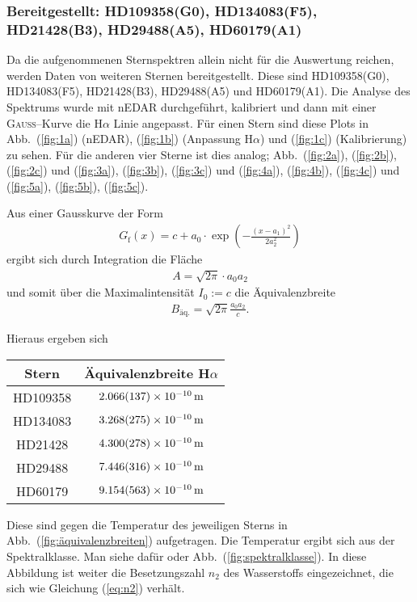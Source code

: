 \subsubsection{Bereitgestellt: HD109358(G0), HD134083(F5), HD21428(B3), HD29488(A5), HD60179(A1)}
Da die aufgenommenen Sternspektren allein nicht für die Auswertung reichen, werden Daten von weiteren Sternen bereitgestellt.
Diese sind HD109358(G0), HD134083(F5), HD21428(B3), HD29488(A5) und HD60179(A1).
Die Analyse des Spektrums wurde mit nEDAR durchgeführt, kalibriert und dann mit einer \textsc{Gauss}--Kurve die H$\alpha $ Linie angepasst.
Für einen Stern sind diese Plots in Abb.\ (\ref{fig:1a}) (nEDAR), (\ref{fig:1b}) (Anpassung H$\alpha $) und (\ref{fig:1c}) (Kalibrierung) zu sehen.
Für die anderen vier Sterne ist dies analog; Abb.\ (\ref{fig:2a}), (\ref{fig:2b}), (\ref{fig:2c}) und (\ref{fig:3a}), (\ref{fig:3b}), (\ref{fig:3c}) und (\ref{fig:4a}), (\ref{fig:4b}), (\ref{fig:4c}) und (\ref{fig:5a}), (\ref{fig:5b}), (\ref{fig:5c}).

Aus einer Gausskurve der Form
\begin{align}
  G_\textrm{f}(x)=c+a_0\cdot\exp(-\frac{(x-a_1)^2}{2a_2^2})
\end{align}
ergibt sich durch Integration die Fläche
\begin{align}
  A=\sqrt{2\pi}\cdot a_0a_2
\end{align}
und somit über die Maximalintensität $I_0:=c$ die Äquivalenzbreite
\begin{align}
  B_\textrm{äq.}=\sqrt{2\pi}\frac{a_0a_2}{c}.
\end{align}

Hieraus ergeben sich
\begin{table}[h]
  \begin{tabular}{cc}
    \toprule
    Stern & Äquivalenzbreite H$\alpha $\\
    \midrule
    HD109358 & $\SI{2.066+-0.137e-10}{m}$ \\
    HD134083 & $\SI{3.268+-0.275e-10}{m}$ \\
    HD21428 & $\SI{4.300+-0.278e-10}{m}$ \\
    HD29488 & $\SI{7.446+-0.316e-10}{m}$ \\
    HD60179 & $\SI{9.154+-0.563e-10}{m}$ \\
    \bottomrule
  \end{tabular}
\end{table} %

Diese sind gegen die Temperatur des jeweiligen Sterns in Abb.\ (\ref{fig:äquivalenzbreiten}) aufgetragen.
Die Temperatur ergibt sich aus der Spektralklasse.
Man siehe dafür \cite{anleitung464} oder Abb.\ (\ref{fig:spektralklasse}).
In diese Abbildung ist weiter die Besetzungszahl $n_2$ des Wasserstoffs eingezeichnet, die sich wie Gleichung (\ref{eq:n2}) verhält.

